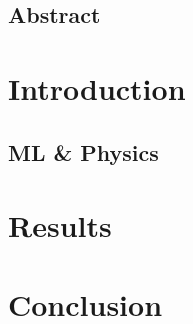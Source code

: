\documentclass[12pt,a4paper]{book}
\begin{document}
  
  \maketitle
  
  \chapter*{Abstract}
  
  \cleardoublepage
  \tableofcontents

  \part{Introduction}
  \chapter{ML \& Physics}
  
  

  \part{Results}
  
  
  

  \part{Conclusion}
  


  \appendix
  
  
  
  
  \cleardoublepage
  \nocite{*}
  \printbibliography
\end{document}
